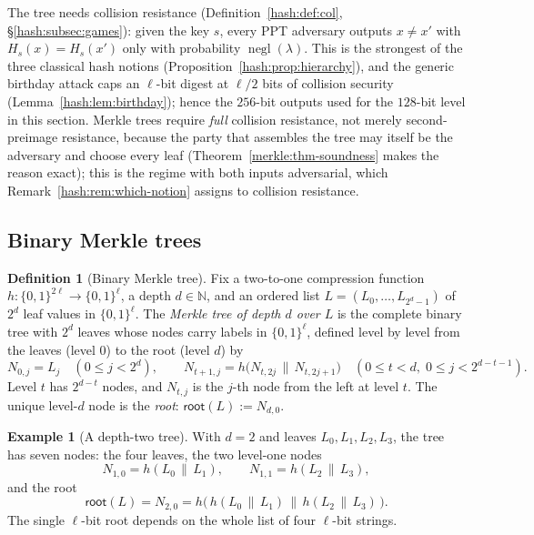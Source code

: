 \documentclass[11pt,a4paper]{article}
\theoremstyle{definition}
\newtheorem{definition}[theorem]{Definition}
\newtheorem{example}[theorem]{Example}
\theoremstyle{remark}
\newcommand{\N}{\ensuremath{\mathbb{N}}}
\DeclareMathOperator{\negl}{negl}
\begin{document}
The tree needs collision resistance (Definition~\ref{hash:def:col},
\S\ref{hash:subsec:games}): given the key \(s\), every PPT adversary
outputs \(x \neq x'\) with \(H_{s}(x) = H_{s}(x')\) only with
probability \(\negl(\lambda)\). This is the strongest of the three
classical hash notions (Proposition~\ref{hash:prop:hierarchy}), and the
generic birthday attack caps an \(\ell\)-bit digest at \(\ell/2\) bits
of collision security (Lemma~\ref{hash:lem:birthday}); hence the
\(256\)-bit outputs used for the \(128\)-bit level in this section.
Merkle trees require \emph{full} collision resistance, not merely
second-preimage resistance, because the party that assembles the tree
may itself be the adversary and choose every leaf
(Theorem~\ref{merkle:thm-soundness} makes the reason exact); this is
the regime with both inputs adversarial, which
Remark~\ref{hash:rem:which-notion} assigns to collision resistance.

\subsection{Binary Merkle trees}\label{merkle:sec-tree}

\begin{definition}[Binary Merkle tree]\label{merkle:def-tree}
Fix a two-to-one compression function
\(h \colon \{0,1\}^{2\ell} \to \{0,1\}^{\ell}\), a depth \(d \in \N\),
and an ordered list \(L = (L_0, \dots, L_{2^d - 1})\) of \(2^d\)
leaf values in \(\{0,1\}^{\ell}\). The \emph{Merkle tree of depth
\(d\) over \(L\)} is the complete binary tree with \(2^d\) leaves
whose nodes carry labels in \(\{0,1\}^{\ell}\), defined level by
level from the leaves (level \(0\)) to the root (level \(d\)) by
\begin{equation}\label{merkle:eq-recurrence}
N_{0,j} = L_j \quad (0 \le j < 2^d),
\qquad
N_{t+1,j} = h\bigl(N_{t,2j} \,\|\, N_{t,2j+1}\bigr)
\quad (0 \le t < d,\; 0 \le j < 2^{d-t-1}).
\end{equation}
Level \(t\) has \(2^{d-t}\) nodes, and \(N_{t,j}\) is the \(j\)-th
node from the left at level \(t\). The unique level-\(d\) node is the
\emph{root}:
\(\mathsf{root}(L) := N_{d,0}\).
\end{definition}

\begin{example}[A depth-two tree]\label{merkle:exp-depth2}
With \(d = 2\) and leaves \(L_0, L_1, L_2, L_3\), the tree has seven
nodes: the four leaves, the two level-one nodes
\[
N_{1,0} = h(L_0 \,\|\, L_1), \qquad N_{1,1} = h(L_2 \,\|\, L_3),
\]
and the root
\[
\mathsf{root}(L) = N_{2,0}
= h\bigl(\, h(L_0 \,\|\, L_1) \,\|\, h(L_2 \,\|\, L_3) \,\bigr).
\]
The single \(\ell\)-bit root depends on the whole list of four
\(\ell\)-bit strings.
\end{example}
\end{document}

